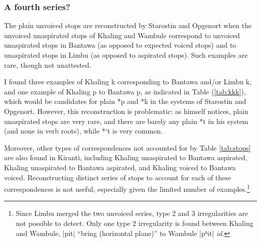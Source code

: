 \documentclass[oldfontcommands,oneside,a4paper,11pt]{article}
\newcommand{\ipa}[1]{{\phon\mbox{#1}}} %
\newcommand{\dhatu}[2]{|\ipa{#1}| ``#2''}
\begin{document}
\subsubsection{A fourth series?} \label{sec:fourth}
The plain unvoiced stops are reconstructed by Starostin and Opgenort  when the unvoiced unaspirated stops of Khaling and Wambule correspond to unvoiced unaspirated stops in Bantawa (as opposed to expected voiced stops) and to unaspirated stops in Limbu (as opposed to aspirated stops). Such examples are rare, though not unattested. 

I found three examples of Khaling \ipa{k} corresponding to Bantawa and/or Limbu \ipa{k}, and one example of Khaling \ipa{p} to Bantawa \ipa{p}, as indicated in Table (\ref{tab:kkk}), which would be candidates for plain *\ipa{p} and *\ipa{k} in the systems of Starostin and Opgenort. However, this reconstruction is problematic: as \citet[17]{opgenort05jero} himself notices, plain unaspirated stops are very rare, and there are barely any plain *\ipa{t} in his system (and none in verb roots), while *\ipa{`t} is very common.  


Moreover, other types of correspondences not accounted for by Table \ref{tab:stops} are also found in Kiranti, including Khaling  unaspirated to Bantawa aspirated, Khaling unaspirated to Bantawa aspirated, and Khaling voiced to Bantawa voiced. Reconstructing distinct series of stops to account for each of these correspondences is not useful, especially given the limited number of examples.\footnote{Since Limbu merged the two unvoiced series, type 2 and 3 irregularities are not possible to detect. Only one type 2 irregularity is found between Khaling and Wambule, \dhatu{pit}{bring (horizontal plane)} to Wambule |\ipa{pʰit}| \textit{id}.}
\end{document}
